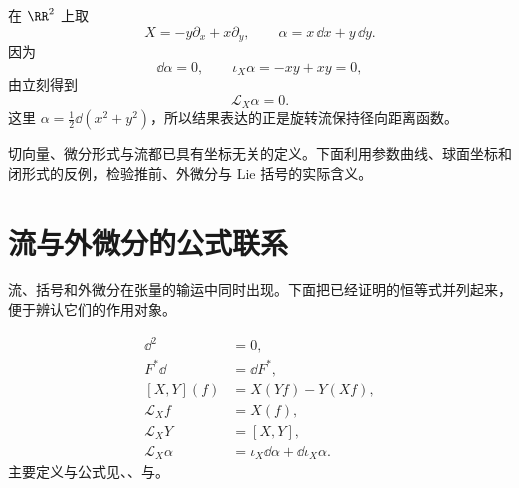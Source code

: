 \begin{exbox}[旋转流保持径向一形式]
在 $\RR^2$ 上取
\[
X=-y\partial_x+x\partial_y,
\qquad
\alpha=x\,\dd x+y\,\dd y.
\]
因为
\[
\dd\alpha=0,
\qquad
\iota_{X}\alpha=-xy+xy=0,
\]
由立刻得到
\[
\mathcal L_X\alpha=0.
\]
这里 $\alpha=\tfrac12\dd(x^2+y^2)$，所以结果表达的正是旋转流保持径向距离函数。
\end{exbox}


切向量、微分形式与流都已具有坐标无关的定义。下面利用参数曲线、球面坐标和闭形式的反例，检验推前、外微分与 Lie 括号的实际含义。






\section{流与外微分的公式联系}
流、括号和外微分在张量的输运中同时出现。下面把已经证明的恒等式并列起来，便于辨认它们的作用对象。
\begin{note}[公式之间的联系]
\begin{align*}
\dd^2&=0,\\
F^*\dd&=\dd F^*,\\
[X,Y](f)&=X(Yf)-Y(Xf),\\
\mathcal L_Xf&=X(f),\\
\mathcal L_XY&=[X,Y],\\
\mathcal L_X\alpha&=\iota_{X}\dd\alpha+\dd\iota_{X}\alpha.
\end{align*}
主要定义与公式见、、与。
\end{note}



